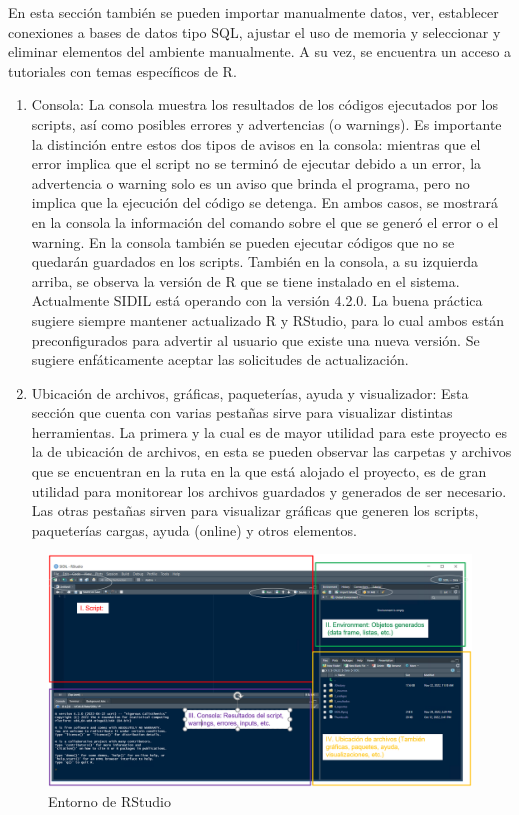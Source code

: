 \documentclass[
]{article}
\begin{document}
En esta sección también se pueden importar manualmente datos, ver, establecer conexiones a bases de datos tipo SQL, ajustar el uso de memoria y seleccionar y eliminar elementos del ambiente manualmente. A su vez, se encuentra un acceso a tutoriales con temas específicos de R.

\begin{enumerate}
\def\labelenumi{\arabic{enumi}.}
\setcounter{enumi}{2}
\item
  Consola: La consola muestra los resultados de los códigos ejecutados por los scripts, así como posibles errores y advertencias (o warnings). Es importante la distinción entre estos dos tipos de avisos en la consola: mientras que el error implica que el script no se terminó de ejecutar debido a un error, la advertencia o warning solo es un aviso que brinda el programa, pero no implica que la ejecución del código se detenga. En ambos casos, se mostrará en la consola la información del comando sobre el que se generó el error o el warning. En la consola también se pueden ejecutar códigos que no se quedarán guardados en los scripts. También en la consola, a su izquierda arriba, se observa la versión de R que se tiene instalado en el sistema. Actualmente SIDIL está operando con la versión 4.2.0. La buena práctica sugiere siempre mantener actualizado R y RStudio, para lo cual ambos están preconfigurados para advertir al usuario que existe una nueva versión. Se sugiere enfáticamente aceptar las solicitudes de actualización.
\item
  Ubicación de archivos, gráficas, paqueterías, ayuda y visualizador: Esta sección que cuenta con varias pestañas sirve para visualizar distintas herramientas. La primera y la cual es de mayor utilidad para este proyecto es la de ubicación de archivos, en esta se pueden observar las carpetas y archivos que se encuentran en la ruta en la que está alojado el proyecto, es de gran utilidad para monitorear los archivos guardados y generados de ser necesario. Las otras pestañas sirven para visualizar gráficas que generen los scripts, paqueterías cargas, ayuda (online) y otros elementos.
\end{enumerate}

\begin{figure}
\includegraphics[width=17.67in]{images-1/06/RStudio} \caption{Entorno de RStudio}\label{fig:entornoRStudio}
\end{figure}
\end{document}
